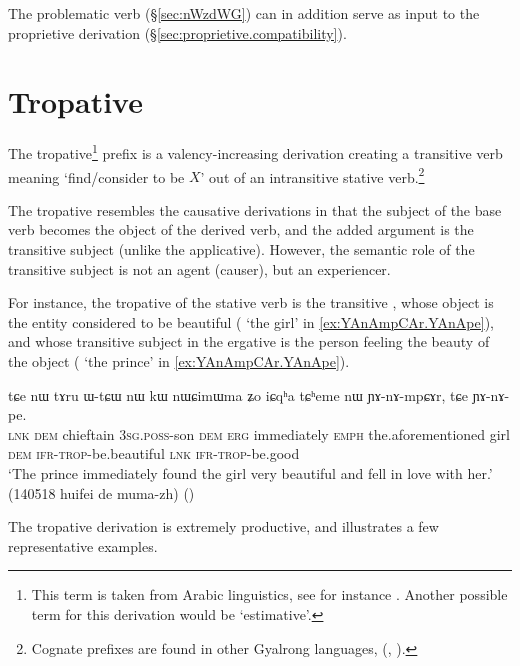 The problematic verb    (§\ref{sec:nWzdWG}) can in addition serve as input to the proprietive derivation (§\ref{sec:proprietive.compatibility}).

\section{Tropative} \label{sec:tropative}
The tropative\footnote{This term is taken from Arabic linguistics, see for instance \citet{larcher96}. Another possible term for this derivation would be `estimative'. }  prefix is a valency-increasing derivation creating a transitive verb meaning `find/consider to be $X$' out of an intransitive stative verb.\footnote{Cognate prefixes are found in other Gyalrong languages, (\citealt[5--6]{jackson06paisheng}, \citealt{jacques13tropative}).} 
 
The tropative resembles the causative derivations in that the subject of the base verb becomes the object of the derived verb, and the added argument is the transitive subject (unlike the applicative). However, the semantic role of the transitive subject is not an agent (causer), but an experiencer.

For instance, the tropative of the stative verb  is the transitive , whose object is the entity considered to be beautiful ( `the girl' in \ref{ex:YAnAmpCAr.YAnApe}), and whose transitive subject in the ergative is the person feeling the beauty of the object ( `the prince' in \ref{ex:YAnAmpCAr.YAnApe}).

\begin{exe}
\ex \label{ex:YAnAmpCAr.YAnApe}
\gll tɕe nɯ tɤru ɯ-tɕɯ nɯ kɯ nɯɕimɯma ʑo iɕqʰa tɕʰeme nɯ ɲɤ-nɤ-mpɕɤr,
tɕe ɲɤ-nɤ-pe. \\
\textsc{lnk} \textsc{dem} chieftain \textsc{3sg}.\textsc{poss}-son \textsc{dem} \textsc{erg} immediately \textsc{emph} the.aforementioned girl \textsc{dem} \textsc{ifr}-\textsc{trop}-be.beautiful \textsc{lnk} \textsc{ifr}-\textsc{trop}-be.good \\
\glt `The prince immediately found the girl very beautiful and fell in love with her.' (140518 huifei de muma-zh)
()
\end{exe}

The tropative derivation is extremely productive, and  illustrates a few representative examples.

